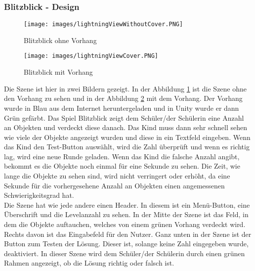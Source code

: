 \subsubsection{Blitzblick - Design}
\begin{figure}[htbp]
  \centering
  \texttt{[image: images/lightningViewWithoutCover.PNG]}
  \caption{Blitzblick ohne Vorhang}
  \label{withoutCover}
\end{figure}
\begin{figure}[htbp]
  \centering
  \texttt{[image: images/lightningViewCover.PNG]}
  \caption{Blitzblick mit Vorhang}
  \label{withCover}
\end{figure}
Die Szene ist hier in zwei Bildern gezeigt. In der Abbildung \ref{withoutCover} ist die Szene ohne den Vorhang zu sehen und in der Abbildung \ref{withCover} mit dem Vorhang. Der Vorhang wurde in Blau aus dem Internet heruntergeladen und in Unity wurde er dann Grün gefärbt\autocite{curtain}. Das Spiel Blitzblick zeigt dem Schüler/der Schülerin eine Anzahl an Objekten und verdeckt diese danach. Das Kind muss dann sehr schnell sehen wie viele der Objekte angezeigt wurden und diese in ein Textfeld eingeben. Wenn das Kind den Test-Button auswählt, wird die Zahl überprüft und wenn es richtig lag, wird eine neue Runde geladen. Wenn das Kind die falsche Anzahl angibt, bekommt es die Objekte noch einmal für eine Sekunde zu sehen. Die Zeit, wie lange die Objekte zu sehen sind, wird nicht verringert oder erhöht, da eine Sekunde für die vorhergesehene Anzahl an Objekten einen angemessenen Schwierigkeitsgrad hat.\\
Die Szene hat wie jede andere einen Header. In diesem ist ein Menü-Button, eine Überschrift und die Levelanzahl zu sehen. In der Mitte der Szene ist das Feld, in dem die Objekte auftauchen, welches von einem grünen Vorhang verdeckt wird. Rechts davon ist das Eingabefeld für den Nutzer. Ganz unten in der Szene ist der Button zum Testen der Lösung. Dieser ist, solange keine Zahl eingegeben wurde, deaktiviert. In dieser Szene wird dem Schüler/der Schülerin durch einen grünen Rahmen angezeigt, ob die Lösung richtig oder falsch ist.\\
